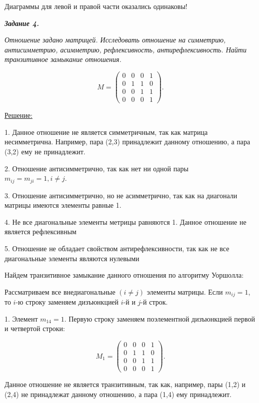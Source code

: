 \documentclass[11pt]{article}
\begin{document}
Диаграммы для левой и правой части оказались одинаковы!

\pagebreak

\textit{\textbf{Задание 4.}}

\textit{Отношение задано матрицей. Исследовать отношение на симметрию,
антисимметрию, асимметрию, рефлексивность, антирефлексивность. Найти
транзитивное замыкание отношения.}

$$M=
\begin{pmatrix}
        0 & 0 & 0 & 1\\
        0 & 1 & 1 & 0\\
        0 & 0 & 1 & 1\\
        0 & 0 & 0 & 1
\end{pmatrix}.$$

\underline{Решение:}

1. Данное отношение не является симметричным, так как матрица
несимметрична. Например, пара (2,3) принадлежит данному отношению, а пара
(3,2) ему не принадлежит.

2. Отношение антисимметрично, так как нет ни одной пары\\
$m_{ij} = m_{ji} = 1, i \neq j$.

3. Отношение антисимметрично, но не асимметрично, так как на
диагонали матрицы имеются элементы равные 1.

4. Не все диагональные элементы метрицы равняются 1.
Данное отношение не является рефлексивным

5. Отношение не обладает свойством антирефлексивности, так как
не все диагональные элементы являются нулевыми

Найдем транзитивное замыкание данного отношения по алгоритму
Уоршолла:

Рассматриваем все внедиагональные $(i \neq j)$ элементы матрицы.
Если $m_{ij}=1$, то $i$-ю строку заменяем дизъюнкцией $i$-й и $j$-й строк.

1. Элемент $m_{14}=1$. Первую строку заменяем поэлементной
дизъюнкцией первой и четвертой строки:

$$M_1=
\begin{pmatrix}
        0 & 0 & 0 & 1\\
        0 & 1 & 1 & 0\\
        0 & 0 & 1 & 1\\
        0 & 0 & 0 & 1
\end{pmatrix}.$$

Данное отношение не является транзитивным, так как, например, пары
(1,2) и (2,4) не принадлежат данному отношению, а пара (1,4)
ему принадлежит.
\end{document}
